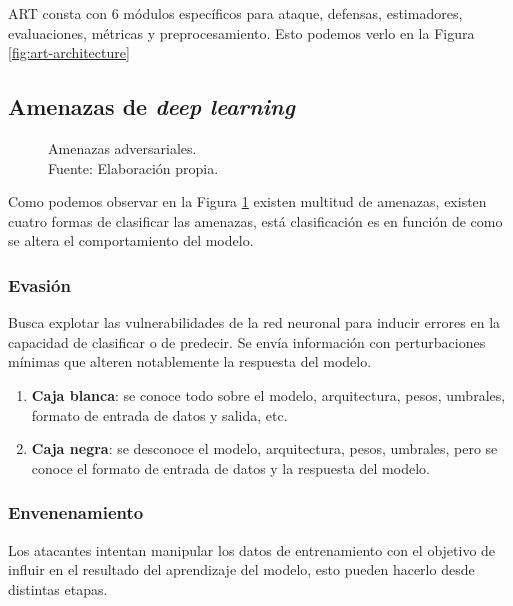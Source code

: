 ART \cite{art2018} consta con 6 módulos específicos para ataque, defensas, estimadores, evaluaciones, métricas y preprocesamiento. Esto podemos verlo en la Figura \ref{fig:art-architecture}

\subsection{Amenazas de \textit{deep learning}}
\begin{figure}[H]
  \centering
  \centerline{}
  \caption{Amenazas adversariales.\\Fuente: Elaboración propia.}
  \label{fig:art-adversarial-threats}
\end{figure}

Como podemos observar en la Figura \ref{fig:art-adversarial-threats} existen multitud de amenazas, existen cuatro formas de clasificar las amenazas, está clasificación es en función de como se altera el comportamiento del modelo.

\subsubsection{Evasión}

Busca explotar las vulnerabilidades de la red neuronal para inducir errores en la capacidad de clasificar o de predecir. Se envía información con perturbaciones mínimas que alteren notablemente la respuesta del modelo.

\begin{enumerate}
  \item \textbf{Caja blanca}: se conoce todo sobre el modelo, arquitectura, pesos, umbrales, formato de entrada de datos y salida, etc. \cite{learning-machine-learning-part-3-attacking}
  \item \textbf{Caja negra}: se desconoce el modelo, arquitectura, pesos, umbrales, pero se conoce el formato de entrada de datos y la respuesta del modelo. \cite{learning-machine-learning-part-3-attacking}
\end{enumerate}

\subsubsection{Envenenamiento}

Los atacantes intentan manipular los datos de entrenamiento con el objetivo de influir en el resultado del aprendizaje del modelo, esto pueden hacerlo desde distintas etapas.

